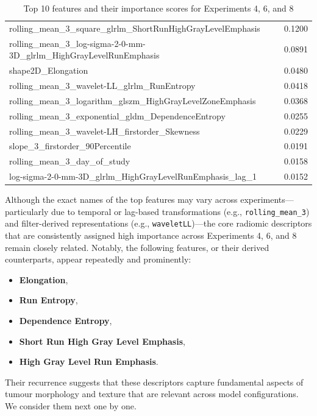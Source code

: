 \documentclass[12pt, a4paper]{report}
\begin{document}
\begin{table}[H]
{\begin{tabular}{|l|c|}
rolling\_mean\_3\_square\_glrlm\_ShortRunHighGrayLevelEmphasis & 0.1200 \\
rolling\_mean\_3\_log-sigma-2-0-mm-3D\_glrlm\_HighGrayLevelRunEmphasis & 0.0891 \\
shape2D\_Elongation & 0.0480 \\
rolling\_mean\_3\_wavelet-LL\_glrlm\_RunEntropy & 0.0418 \\
rolling\_mean\_3\_logarithm\_glszm\_HighGrayLevelZoneEmphasis & 0.0368 \\
rolling\_mean\_3\_exponential\_gldm\_DependenceEntropy & 0.0255 \\
rolling\_mean\_3\_wavelet-LH\_firstorder\_Skewness & 0.0229 \\
slope\_3\_firstorder\_90Percentile & 0.0191 \\
rolling\_mean\_3\_day\_of\_study & 0.0158 \\
log-sigma-2-0-mm-3D\_glrlm\_HighGrayLevelRunEmphasis\_lag\_1 & 0.0152 \\
\hline
\end{tabular}
}
\caption{Top 10 features and their importance scores for Experiments 4, 6, and 8}
\label{table:top10_segmented}
\end{table}

Although the exact names of the top features may vary across experiments—particularly due to temporal or lag-based transformations (e.g., \texttt{rolling\_mean\_3}) and filter-derived representations (e.g., \texttt{wavelet\-LL})—the core radiomic descriptors that are consistently assigned high importance across Experiments 4, 6, and 8 remain closely related. Notably, the following features, or their derived counterparts, appear repeatedly and prominently: 
\begin{itemize}
    \item \textbf{Elongation},
    \item \textbf{Run Entropy},
    \item \textbf{Dependence Entropy},
    \item \textbf{Short Run High Gray Level Emphasis},
    \item \textbf{High Gray Level Run Emphasis}.
\end{itemize}

Their recurrence suggests that these descriptors capture fundamental aspects of tumour morphology and texture that are relevant across model configurations. We consider them next one by one.
\end{document}
